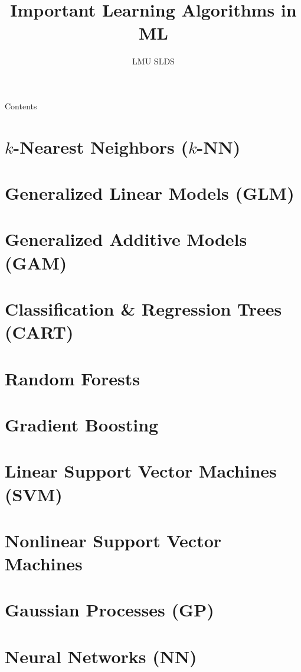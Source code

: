\documentclass[11pt, t, aspectratio=169]{beamer}
\title{Important Learning Algorithms in ML}
\institute{\href{https://compstat-lmu.github.io/lecture_i2ml/}{
compstat-lmu.github.io/lecture\_i2ml}}
\author{LMU SLDS}
\date{}
\begin{document}
\lecturechapter{}

\begin{frame}{Contents}
  \tableofcontents
\end{frame}

\footnotesize


\section{$k$-Nearest Neighbors ($k$-NN)}


\section{Generalized Linear Models (GLM)}


% 

\section{Generalized Additive Models (GAM)}


\section{Classification \& Regression Trees (CART)}


\section{Random Forests}


\section{Gradient Boosting}


\section{Linear Support Vector Machines (SVM)}


\section{Nonlinear Support Vector Machines}


\section{Gaussian Processes (GP)}


\section{Neural Networks (NN)}


\endlecture
\end{document}
